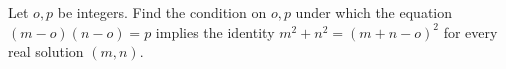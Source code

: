 Let $o,p$ be integers. Find the condition on $o,p$ under which the equation $(m-o)(n-o)=p$ implies the identity $m^2+n^2=(m+n-o)^2$ for every real solution $(m,n)$.
